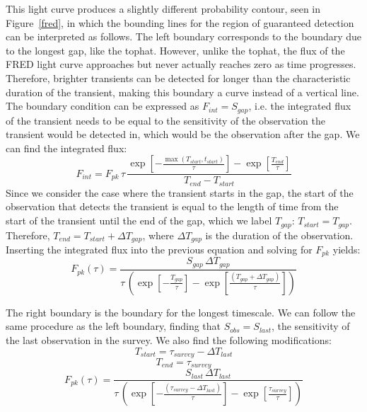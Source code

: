 \documentclass[12pt]{article}
\begin{document}
This light curve produces a slightly different probability contour, seen in Figure~\ref{fred}, in which the bounding lines for the region of guaranteed detection can be interpreted as follows. The left boundary corresponds to the boundary due to the longest gap, like the tophat. However, unlike the tophat, the flux of the FRED light curve approaches but never actually reaches zero as time progresses. Therefore, brighter transients can be detected for longer than the characteristic duration of the transient, making this boundary a curve instead of a vertical line. The boundary condition can be expressed as $F_{int}=S_{gap}$, i.e. the integrated flux of the transient needs to be equal to the sensitivity of the observation the transient would be detected in, which would be the observation after the gap. We can find the integrated flux:
\begin{equation}
   F_{int} = F_{pk}\,\tau\,\frac{\exp\left[-\frac{\max(T_{start},t_{start})}{\tau}\right] - \exp\left[\frac{T_{end}}{\tau}\right]}{T_{end}-T_{start}} 
\end{equation}
Since we consider the case where the transient starts in the gap, the start of the observation that detects the transient is equal to the length of time from the start of the transient until the end of the gap, which we label $T_{gap}$: $T_{start}=T_{gap}$. 
Therefore, $T_{end}=T_{start}+\Delta T_{gap}$, where $\Delta T_{gap}$ is the duration of the observation. Inserting the integrated flux into the previous equation and solving for $F_{pk}$ yields:
\begin{equation}
F_{pk}(\tau) = \frac{S_{gap}\,\Delta T_{gap}}{\tau\,\left(\exp\left[-\frac{T_{gap}}{\tau}\right] - \exp\left[\frac{(T_{gap} + \Delta T_{gap})}{\tau}\right]\right)}
\end{equation}

The right boundary is the boundary for the longest timescale. We can follow the same procedure as the left boundary, finding that $S_{obs} = S_{last}$, the sensitivity of the last observation in the survey. We also find the following modifications:
\begin{equation}
T_{start} = \tau_{survey}  - \Delta T_{last}
\end{equation}
\begin{equation}
    T_{end} = \tau_{survey}
\end{equation}
\begin{equation}
    F_{pk}(\tau) = \frac{S_{last}\,\Delta T_{last}}{\tau\,\left(\exp\left[-\frac{(\tau_{survey} - \Delta T_{last})}{\tau}\right] - \exp\left[\frac{\tau_{survey}}{\tau}\right]\right)}
\end{equation}
\end{document}

